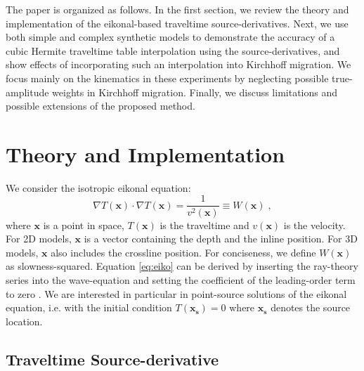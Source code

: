 The paper is organized as follows. In the first section, we review the theory and implementation of 
the eikonal-based traveltime source-derivatives. Next, we use both simple and complex synthetic models 
to demonstrate the accuracy of a cubic Hermite traveltime table interpolation using the source-derivatives, 
and show effects of incorporating such an interpolation into Kirchhoff migration. We focus mainly on 
the kinematics in these experiments by neglecting possible true-amplitude weights in Kirchhoff migration. 
Finally, we discuss limitations and possible extensions of the proposed method. 

\section{Theory and Implementation}

We consider the isotropic eikonal equation:
\begin{equation}
\label{eq:eiko}
\nabla T (\mathbf{x}) \cdot \nabla T (\mathbf{x}) = 
\frac{1}{v^2 (\mathbf{x})} \equiv W (\mathbf{x})\;,
\end{equation}
where $\mathbf{x}$ is a point in space, $T(\mathbf{x})$ is the traveltime and $v(\mathbf{x})$ is the 
velocity. For 2D models, $\mathbf{x}$ is a vector containing the depth and the inline position. 
For 3D models, $\mathbf{x}$ also includes the crossline position. For conciseness, we define $W(\mathbf{x})$ 
as slowness-squared. Equation \ref{eq:eiko} can be derived by inserting the ray-theory series 
into the wave-equation and setting the coefficient of the leading-order term to zero \cite[]{chapman}. 
We are interested in particular in point-source solutions of the eikonal equation, i.e. with the 
initial condition $T(\mathbf{x_s}) = 0$ where $\mathbf{x_s}$ denotes the source location. 

\subsection{Traveltime Source-derivative}

